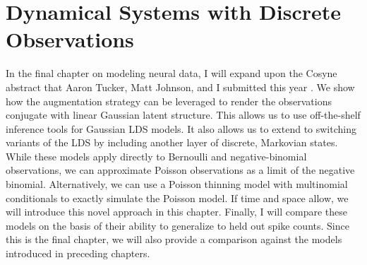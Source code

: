 \chapter{Dynamical Systems with Discrete Observations}
\label{chap:eight}

In the final chapter on modeling neural data, I will expand upon the 
Cosyne abstract that Aaron Tucker, Matt Johnson, and I submitted this 
year \cite{linderman2016cosyne}. 
We show how the \polyagamma augmentation strategy can be leveraged 
to render the observations conjugate with linear Gaussian latent structure. 
This allows us to use off-the-shelf inference tools for Gaussian LDS 
models. It also allows us to extend to switching variants of the LDS 
by including another layer of discrete, Markovian states. 
While these models apply directly to Bernoulli and negative-binomial 
observations, we can approximate Poisson observations as a limit of the 
negative binomial. Alternatively, we can use a Poisson thinning model with 
multinomial conditionals to exactly simulate the Poisson model. If time 
and space allow, we will introduce this novel approach in this chapter.
Finally, I will compare these models on the basis of their ability to generalize to 
held out spike counts. Since this is the final chapter, we will also 
provide a comparison against the models introduced in preceding chapters.
